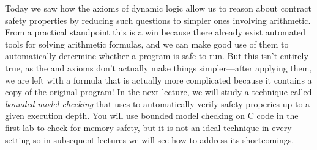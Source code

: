 \documentclass[11pt,twoside]{scrartcl}
\begin{document}
Today we saw how the axioms of dynamic logic allow us to reason about contract safety properties by reducing such questions to simpler ones involving arithmetic. From a practical standpoint this is a win because there already exist automated tools for solving arithmetic formulas, and we can make good use of them to automatically determine whether a program is safe to run. But this isn't entirely true, as the  and  axioms don't actually make things simpler---after applying them, we are left with a formula that is actually more complicated because it contains a copy of the original program! In the next lecture, we will study a technique called \emph{bounded model checking} that uses  to automatically verify safety properies up to a given execution depth. You will use bounded model checking on C code in the first lab to check for memory safety, but it is not an ideal technique in every setting so in subsequent lectures we will see how to address its shortcomings.

% 
\end{document}

